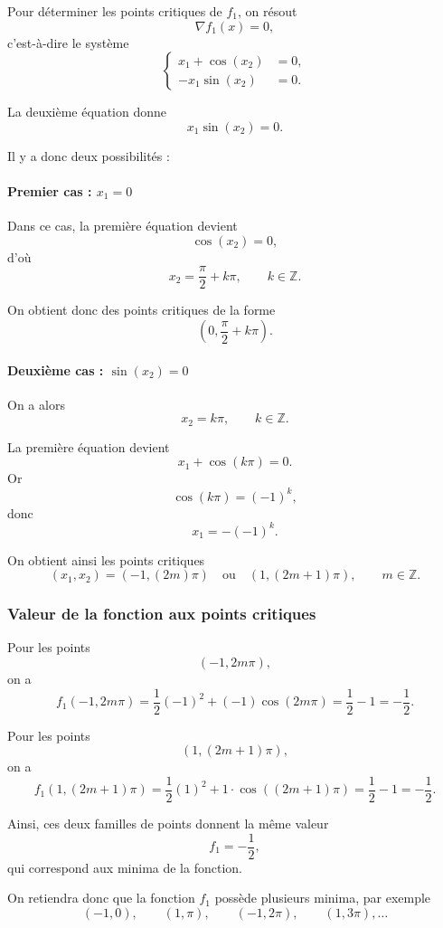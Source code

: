 \documentclass[a4paper,12pt]{article}
\begin{document}
	Pour déterminer les points critiques de $f_1$, on résout
	\[
	\nabla f_1(x)=0,
	\]
	c'est-à-dire le système
	\[
	\left\{
	\begin{aligned}
	x_1+\cos(x_2)&=0,\\
	-x_1\sin(x_2)&=0.
	\end{aligned}
	\right.
	\]
	
	La deuxième équation donne
	\[
	x_1\sin(x_2)=0.
	\]
	
	Il y a donc deux possibilités :
	
	\paragraph{Premier cas : $x_1=0$}
	
	Dans ce cas, la première équation devient
	\[
	\cos(x_2)=0,
	\]
	d'où
	\[
	x_2=\frac{\pi}{2}+k\pi,\qquad k\in\mathbb{Z}.
	\]
	
	On obtient donc des points critiques de la forme
	\[
	\left(0,\frac{\pi}{2}+k\pi\right).
	\]
	
	\paragraph{Deuxième cas : $\sin(x_2)=0$}
	
	On a alors
	\[
	x_2=k\pi,\qquad k\in\mathbb{Z}.
	\]
	
	La première équation devient
	\[
	x_1+\cos(k\pi)=0.
	\]
	Or
	\[
	\cos(k\pi)=(-1)^k,
	\]
	donc
	\[
	x_1=-(-1)^k.
	\]
	
	On obtient ainsi les points critiques
	\[
	(x_1,x_2)=(-1,(2m)\pi)\quad \text{ou} \quad (1,(2m+1)\pi),
	\qquad m\in\mathbb{Z}.
	\]
	
	\subsubsection{Valeur de la fonction aux points critiques}
	
	Pour les points
	\[
	(-1,2m\pi),
	\]
	on a
	\[
	f_1(-1,2m\pi)=\frac12(-1)^2+(-1)\cos(2m\pi)=\frac12-1=-\frac12.
	\]
	
	Pour les points
	\[
	(1,(2m+1)\pi),
	\]
	on a
	\[
	f_1(1,(2m+1)\pi)=\frac12(1)^2+1\cdot \cos((2m+1)\pi)=\frac12-1=-\frac12.
	\]
	
	Ainsi, ces deux familles de points donnent la même valeur
	\[
	f_1=-\frac12,
	\]
	qui correspond aux minima de la fonction.
	
	\bigskip
	
	On retiendra donc que la fonction $f_1$ possède plusieurs minima, par exemple
	\[
	(-1,0),\qquad (1,\pi),\qquad (-1,2\pi),\qquad (1,3\pi), \dots
	\]
	
\end{document}
